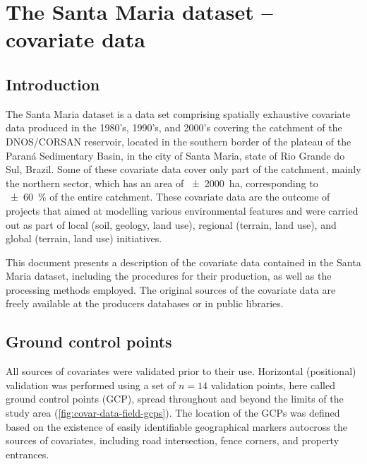 
\artigofalse
\chapter{The Santa Maria dataset -- covariate data}
\label{apen:covar-data}
\usepackage[utf8]{inputenc}


\tocless\section{Introduction}
\label{sec:covar-data-intro}

The Santa Maria dataset is a data set comprising spatially exhaustive covariate data produced in the 1980's, 
1990's, and 2000's covering the catchment of the DNOS/CORSAN reservoir, located in the southern border of the 
plateau of the Paraná Sedimentary Basin, in the city of Santa Maria, state of Rio Grande do Sul, Brazil. Some 
of these covariate data cover only part of the catchment, mainly the northern sector, which has an area of 
\SI{\pm2000}{\hectare}, corresponding to \SI{\pm60}{\percent} of the entire catchment. These covariate data 
are the outcome of projects that aimed at modelling various environmental features and were carried out as 
part of local (soil, geology, land use), regional (terrain, land use), and global (terrain, land use) 
initiatives.

This document presents a description of the covariate data contained in the Santa Maria dataset, including the 
procedures for their production, as well as the processing methods employed. The original sources of the 
covariate data are freely available at the producers databases or in public libraries.


\tocless\section{Ground control points}
\label{sec:covar-data-gcp}

All sources of covariates were validated prior to their use. Horizontal (positional) validation was performed 
using a set of $n = 14$ validation points, here called ground control points (GCP), spread throughout and 
beyond the limits of the study area (\autoref{fig:covar-data-field-gcps}). The location of the GCPs was 
defined based on the existence of easily identifiable geographical markers autocross the sources of 
covariates, including road intersection, fence corners, and property entrances.

